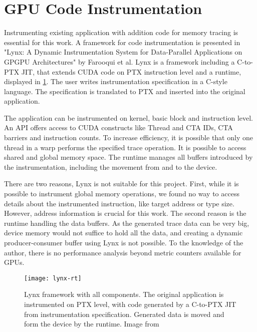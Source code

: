 \section{GPU Code Instrumentation}
Instrumenting existing application with addition code for memory tracing is essential for this work.
A framework for code instrumentation is presented in "Lynx: A Dynamic Instrumentation System for Data-Parallel Applications on GPGPU Architectures" \cite{Farooqui:2012:LDI:2310660.2310989} by Farooqui et al. Lynx is a framework including a C-to-PTX JIT, that extends CUDA code on PTX instruction level and a runtime, displayed in \ref{lynx-rt}. The user writes instrumentation specification in a C-style language. The specification is translated to PTX and inserted into the original application.

The application can be instrumented on kernel, basic block and instruction level. An API offers access to CUDA constructs like Thread and CTA IDs, CTA barriers and instruction counts. To increase
efficiency, it is possible that only one thread in a warp performs the specified trace operation. It is possible to access shared and global memory space. The runtime manages all buffers introduced by the instrumentation, including the movement from and to the device.

There are two reasons, Lynx is not suitable for this project. First, while it is possible to instrument global memory operations, we found no way to access details about the instrumented instruction, like target address or type size. However, address information is crucial for this work. The second reason
is the runtime handling the data buffers. As the generated trace data can be very big, device memory would not suffice to hold all the data, and creating a dynamic producer-consumer buffer using Lynx is not possible.
To the knowledge of the author, there is no performance analysis beyond metric counters available for GPUs.
\begin{figure}[t]
	\centering
	\texttt{[image: lynx-rt]}
	\caption{Lynx framework with all components. The original application is instrumented on PTX level, with code generated by a C-to-PTX JIT from instrumentation specification. Generated data is moved and form the device by the runtime. Image from \cite{Farooqui:2012:LDI:2310660.2310989}}
	\label{lynx-rt}
\end{figure}
